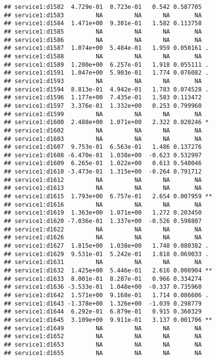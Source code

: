 \documentclass[
]{article}
\begin{document}
\begin{verbatim}
## service1:d1582  4.729e-01  8.723e-01   0.542 0.587705    
## service1:d1583         NA         NA      NA       NA    
## service1:d1584  1.471e+00  9.301e-01   1.582 0.113758    
## service1:d1585         NA         NA      NA       NA    
## service1:d1586         NA         NA      NA       NA    
## service1:d1587  1.074e+00  5.484e-01   1.959 0.050161 .  
## service1:d1588         NA         NA      NA       NA    
## service1:d1589  1.200e+00  6.257e-01   1.918 0.055111 .  
## service1:d1591  1.047e+00  5.903e-01   1.774 0.076082 .  
## service1:d1593         NA         NA      NA       NA    
## service1:d1594  8.813e-01  4.942e-01   1.783 0.074528 .  
## service1:d1596  1.177e+00  7.435e-01   1.583 0.113472    
## service1:d1597  3.376e-01  1.332e+00   0.253 0.799960    
## service1:d1599         NA         NA      NA       NA    
## service1:d1600  2.488e+00  1.071e+00   2.322 0.020246 *  
## service1:d1602         NA         NA      NA       NA    
## service1:d1603         NA         NA      NA       NA    
## service1:d1607  9.753e-01  6.563e-01   1.486 0.137276    
## service1:d1608 -6.470e-01  1.038e+00  -0.623 0.532997    
## service1:d1609  6.265e-01  1.022e+00   0.613 0.540046    
## service1:d1610 -3.473e-01  1.315e+00  -0.264 0.791712    
## service1:d1612         NA         NA      NA       NA    
## service1:d1613         NA         NA      NA       NA    
## service1:d1615  1.793e+00  6.757e-01   2.654 0.007959 ** 
## service1:d1616         NA         NA      NA       NA    
## service1:d1619  1.363e+00  1.071e+00   1.272 0.203450    
## service1:d1620 -7.036e-01  1.337e+00  -0.526 0.598807    
## service1:d1622         NA         NA      NA       NA    
## service1:d1626         NA         NA      NA       NA    
## service1:d1627  1.815e+00  1.038e+00   1.748 0.080382 .  
## service1:d1629  9.531e-01  5.242e-01   1.818 0.069033 .  
## service1:d1631         NA         NA      NA       NA    
## service1:d1632  1.425e+00  5.446e-01   2.616 0.008904 ** 
## service1:d1633  8.001e-01  8.287e-01   0.966 0.334274    
## service1:d1636 -3.533e-01  1.048e+00  -0.337 0.735960    
## service1:d1642  1.571e+00  9.168e-01   1.714 0.086606 .  
## service1:d1643 -1.378e+00  1.326e+00  -1.039 0.298779    
## service1:d1644  6.292e-01  6.879e-01   0.915 0.360329    
## service1:d1645  3.109e+00  9.911e-01   3.137 0.001706 ** 
## service1:d1649         NA         NA      NA       NA    
## service1:d1652         NA         NA      NA       NA    
## service1:d1653         NA         NA      NA       NA    
## service1:d1655         NA         NA      NA       NA    

\end{verbatim}
\end{document}
